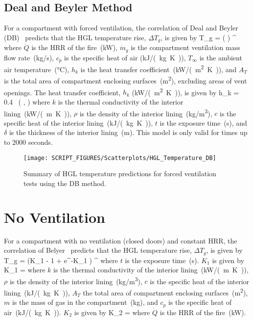 \subsection{Deal and Beyler Method}

For a compartment with forced ventilation, the correlation of Deal and Beyler (DB)~\cite{SFPE:Walton} predicts that the HGL temperature rise, $\Delta T_g$, is given by
\be
\Delta T_g = \left(  \right) \quad ^
\label{eq:DB}
\ee
where $\dot Q$ is the HRR of the fire~(\si{kW}), $\dot m_g$ is the compartment ventilation mass flow rate~(\si{kg/s}), $c_p$ is the specific heat of air (\si{kJ/(kg.K)}), $T_\infty$ is the ambient air temperature~(\si{\celsius}), $h_k$ is the heat transfer coefficient~(\si{kW/(m^2.K)}), and $A_T$ is the total area of compartment enclosing surfaces~(\si{m^2}), excluding areas of vent openings. The heat transfer coefficient, $h_k$ (\si{kW/(m^2.K)}), is given by 
\be
h_k = 0.4\  \left(  ,  \right)
\label{eq:DB_hk}
\ee
where $k$ is the thermal conductivity of the interior lining~(\si{kW/(m.K)}), $\rho$ is the density of the interior lining~(\si{kg/m^3}), $c$ is the specific heat of the interior lining~(\si{kJ/(kg.K)}), $t$ is the exposure time~(\si{\second}), and $\delta$ is the thickness of the interior lining~(\si{m}). This model is only valid for times up to 2000 seconds.

\begin{figure}[!ht]
\begin{center}
\texttt{[image: SCRIPT\_FIGURES/Scatterplots/HGL\_Temperature\_DB]}
\end{center}
\caption[Summary of HGL temperature predictions for forced ventilation tests (DB)]
{Summary of HGL temperature predictions for forced ventilation tests using the DB method.}
\label{HGL_Summary_Forced_Ventilation_DB}
\end{figure}


\clearpage


\section{No Ventilation}

For a compartment with no ventilation (closed doors) and constant HRR, the correlation of Belyer~\cite{SFPE:Walton} predicts that the HGL temperature rise, $\Delta T_g$, is given by
\be
\Delta T_g =  (K_1  - 1 + e^{-K_1 }) \quad ^
\label{eq:Beyler}
\ee
where $t$ is the exposure time~(\si{\second}). $K_1$ is given by
\be
K_1 = 
\label{eq:Beyler_K1}
\ee
where $k$ is the thermal conductivity of the interior lining~(\si{kW/(m.K)}), $\rho$ is the density of the interior lining~(\si{kg/m^3}), $c$ is the specific heat of the interior lining~(\si{kJ/(kg.K)}), $A_T$ the total area of compartment enclosing surfaces~(\si{m^2}), $m$ is the mass of gas in the compartment~(\si{kg}), and $c_p$ is the specific heat of air~(\si{kJ/(kg.K)}). $K_2$ is given by
\be
K_2 = 
\label{eq:Beyler_K2}
\ee
where $\dot Q$ is the HRR of the fire~(\si{kW}).


